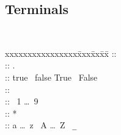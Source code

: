 \subsection{Terminals}
{\tt
\begin{tabbing}
xxxxxxxxxxxxxxxx\= xxx\= xx\=  xx\= \kill
\IntegerConstant \>::\>\> \Opt{-} \Number\\
\RealConstant \>::\>\> \Opt{-} \Number .\Number\\
\BooleanConstant \>::\>\> true \Alt\ false \Alt True \Alt\ False\\
\Number \>::\>\> \Digit \Digit *\\
\Digit \>::\> \Alt\ 1 \Alt\ldots\Alt\ 9\\
\Identifier \>::\>\> \Letter \Group{\Letter \Alt\ \Digit} *\\
\Letter \>::\>\> a \Alt\ldots\Alt\ z  \Alt\ A \Alt\ldots\Alt\ Z \Alt\ \verb'_'\\
\end{tabbing}
}

